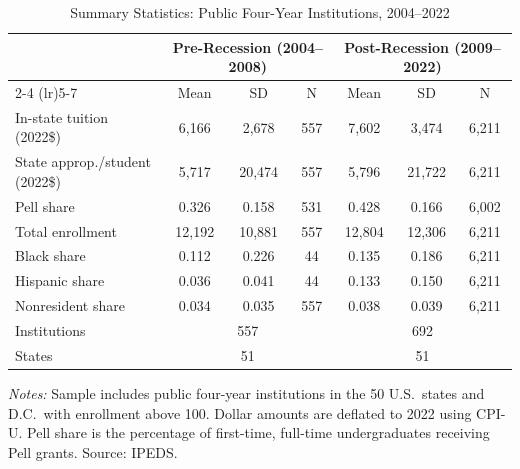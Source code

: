 \begin{table}[htbp]
\centering
\caption{Summary Statistics: Public Four-Year Institutions, 2004--2022}
\label{tab:summary}
\small
\begin{tabular}{lcccccc}
\toprule
 & \multicolumn{3}{c}{Pre-Recession (2004--2008)} & \multicolumn{3}{c}{Post-Recession (2009--2022)} \\
\cmidrule(lr){2-4} \cmidrule(lr){5-7}
 & Mean & SD & N & Mean & SD & N \\
\midrule
In-state tuition (2022\$) & 6,166 & 2,678 & 557 & 7,602 & 3,474 & 6,211 \\
State approp./student (2022\$) & 5,717 & 20,474 & 557 & 5,796 & 21,722 & 6,211 \\
Pell share & 0.326 & 0.158 & 531 & 0.428 & 0.166 & 6,002 \\
Total enrollment & 12,192 & 10,881 & 557 & 12,804 & 12,306 & 6,211 \\
Black share & 0.112 & 0.226 & 44 & 0.135 & 0.186 & 6,211 \\
Hispanic share & 0.036 & 0.041 & 44 & 0.133 & 0.150 & 6,211 \\
Nonresident share & 0.034 & 0.035 & 557 & 0.038 & 0.039 & 6,211 \\
\midrule
Institutions & \multicolumn{3}{c}{557} & \multicolumn{3}{c}{692} \\
States & \multicolumn{3}{c}{51} & \multicolumn{3}{c}{51} \\
\bottomrule
\end{tabular}
\begin{tablenotes}[flushleft]
\small
\item \textit{Notes:} Sample includes public four-year institutions in the 50 U.S.\ states and D.C.\ with enrollment above 100. Dollar amounts are deflated to 2022 using CPI-U. Pell share is the percentage of first-time, full-time undergraduates receiving Pell grants. Source: IPEDS.
\end{tablenotes}
\end{table}
